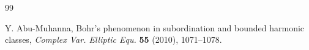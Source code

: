 \documentclass[a4paper,11pt, reqno]{amsart}
\theoremstyle{definition}
\begin{document}
\begin{thebibliography}{99}
	
	
	 {\sc Y. Abu-Muhanna},  Bohr's phenomenon in subordination and bounded harmonic classes, {\it Complex Var. Elliptic Equ.} {\bf  55} (2010), 1071--1078.
	
	
	
	
	
	
	
	
	
	
	
	

\end{thebibliography}
\end{document}
